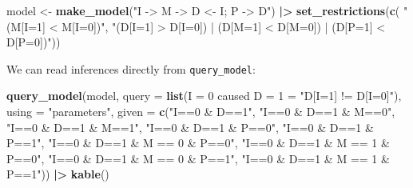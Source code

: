 \documentclass[
  12pt,
]{book}
\newenvironment{Shaded}{\begin{snugshade}}{\end{snugshade}}
\newcommand{\AttributeTok}[1]{\textcolor[rgb]{0.13,0.29,0.53}{#1}}
\newcommand{\FunctionTok}[1]{\textcolor[rgb]{0.13,0.29,0.53}{\textbf{#1}}}
\newcommand{\NormalTok}[1]{#1}
\newcommand{\OtherTok}[1]{\textcolor[rgb]{0.56,0.35,0.01}{#1}}
\newcommand{\SpecialCharTok}[1]{\textcolor[rgb]{0.81,0.36,0.00}{\textbf{#1}}}
\newcommand{\StringTok}[1]{\textcolor[rgb]{0.31,0.60,0.02}{#1}}
\begin{document}
\begin{Shaded}
\begin{Highlighting}[]
\NormalTok{model }\OtherTok{\textless{}{-}} \FunctionTok{make\_model}\NormalTok{(}\StringTok{"I {-}\textgreater{} M {-}\textgreater{} D \textless{}{-} I; P {-}\textgreater{} D"}\NormalTok{) }\SpecialCharTok{|\textgreater{}} 
  \FunctionTok{set\_restrictions}\NormalTok{(}\FunctionTok{c}\NormalTok{( }
    \StringTok{"(M[I=1] \textless{} M[I=0])"}\NormalTok{, }
    \StringTok{"(D[I=1] \textgreater{} D[I=0]) | (D[M=1] \textless{} D[M=0]) | (D[P=1] \textless{} D[P=0])"}\NormalTok{)) }
\end{Highlighting}
\end{Shaded}

We can read inferences directly from \texttt{query\_model}:

\begin{Shaded}
\begin{Highlighting}[]
\FunctionTok{query\_model}\NormalTok{(model, }
            \AttributeTok{query =} \FunctionTok{list}\NormalTok{(}\StringTok{\textasciigrave{}}\AttributeTok{I = 0 caused D = 1}\StringTok{\textasciigrave{}} \OtherTok{=} \StringTok{"D[I=1] != D[I=0]"}\NormalTok{), }
            \AttributeTok{using =} \StringTok{"parameters"}\NormalTok{, }
            \AttributeTok{given =} \FunctionTok{c}\NormalTok{(}\StringTok{"I==0 \& D==1"}\NormalTok{, }
                       \StringTok{"I==0 \& D==1 \& M==0"}\NormalTok{, }
                       \StringTok{"I==0 \& D==1 \& M==1"}\NormalTok{, }
                       \StringTok{"I==0 \& D==1 \& P==0"}\NormalTok{, }
                       \StringTok{"I==0 \& D==1 \& P==1"}\NormalTok{, }
                       \StringTok{"I==0 \& D==1 \& M == 0 \& P==0"}\NormalTok{,}
                       \StringTok{"I==0 \& D==1 \& M == 1 \& P==0"}\NormalTok{,}
                       \StringTok{"I==0 \& D==1 \& M == 0 \& P==1"}\NormalTok{,}
                       \StringTok{"I==0 \& D==1 \& M == 1 \& P==1"}\NormalTok{)) }\SpecialCharTok{|\textgreater{}} \FunctionTok{kable}\NormalTok{()}
\end{Highlighting}
\end{Shaded}
\end{document}

